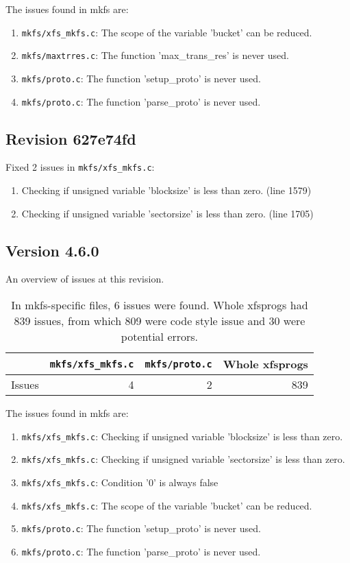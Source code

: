 The issues found in mkfs are:
\begin{enumerate}
	\item {\tt mkfs/xfs\_mkfs.c}: The scope of the variable 'bucket' can be reduced.
	\item {\tt mkfs/maxtrres.c}: The function 'max\_trans\_res' is never used.
	\item {\tt mkfs/proto.c}: The function 'setup\_proto' is never used.
	\item {\tt mkfs/proto.c}: The function 'parse\_proto' is never used.
\end{enumerate}

\subsection{Revision 627e74fd}
Fixed 2 issues in {\tt mkfs/xfs\_mkfs.c}:

\begin{enumerate}
\item Checking if unsigned variable 'blocksize' is less than zero. (line 1579)
\item Checking if unsigned variable 'sectorsize' is less than zero. (line
								     1705)
\end{enumerate}

\subsection{Version 4.6.0}

An overview of issues at this revision.
\begin{table}[h]
\begin{tabular}{|l||r|r||r|}
\hline
& {\tt mkfs/xfs\_mkfs.c} & {\tt mkfs/proto.c} & Whole xfsprogs \\
\hline
Issues & 4 & 2 & 839 \\
\hline
\end{tabular}
\caption{In mkfs-specific files, 6 issues were found. Whole
xfsprogs had 839 issues, from which 809 were code style issue and 30 were
potential errors.}
\end{table}

The issues found in mkfs are:
\begin{enumerate}
	\item {\tt mkfs/xfs\_mkfs.c}: Checking if unsigned variable 'blocksize' is less than zero.
	\item {\tt mkfs/xfs\_mkfs.c}: Checking if unsigned variable 'sectorsize' is less than zero.
	\item {\tt mkfs/xfs\_mkfs.c}: Condition '0' is always false
	\item {\tt mkfs/xfs\_mkfs.c}: The scope of the variable 'bucket' can be reduced.
	\item {\tt mkfs/proto.c}: The function 'setup\_proto' is never used.
	\item {\tt mkfs/proto.c}: The function 'parse\_proto' is never used.
\end{enumerate}



